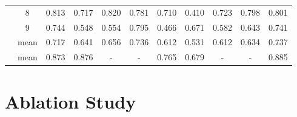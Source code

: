 \documentclass[runningheads]{llncs}
\begin{document}
\begin{table}[t!]
\begin{center}
\begin{tabular}{ccccccccccc}
            	            &8  &\cellcolor{blue!70}0.813  &\cellcolor{blue!25}0.717  &\cellcolor{blue!80}\color{white}0.820  &\cellcolor{blue!40}0.781    &\cellcolor{blue!20}0.710     &\cellcolor{blue!15}0.410      &\cellcolor{blue!30}0.723    &\cellcolor{blue!50}0.798       &\cellcolor{blue!60}0.801\\
            	            
            	            &9 &\cellcolor{blue!70}0.744 &\cellcolor{blue!15}0.548 &\cellcolor{blue!20}0.554  &\cellcolor{blue!80}\color{white}0.795    &\cellcolor{blue!10}0.466     &\cellcolor{blue!50}0.671      &\cellcolor{blue!30}0.582    &\cellcolor{blue!40}0.643       &\cellcolor{blue!60}0.741\\
            	            
            	            \midrule
            	            &mean &\cellcolor{blue!60}0.717 &\cellcolor{blue!40}0.641  &\cellcolor{blue!50}0.656 &\cellcolor{blue!70}0.736   &\cellcolor{blue!20}0.612     &\cellcolor{blue!10}0.531      &\cellcolor{blue!20}0.612    &\cellcolor{blue!30}0.634     &\cellcolor{blue!80}\color{white}0.737\\
            	            \midrule[.75pt]
     \cite{xiao2017fashion}    &mean  &\cellcolor{blue!40}0.873 &\cellcolor{blue!60}0.876 &\cellcolor{blue!10}-  &\cellcolor{blue!10}- &\cellcolor{blue!30}0.765     &\cellcolor{blue!10}0.679      &\cellcolor{blue!10}-    &\cellcolor{blue!10}-      &\cellcolor{blue!80}\color{white}0.885\\
            	            
    \bottomrule 
\end{tabular}
\end{center}
\end{table}


\section{Ablation Study}
\label{ablation}
\end{document}
